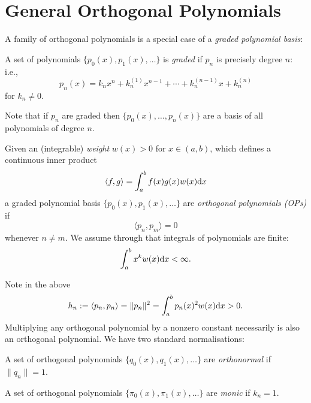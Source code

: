 
\section{General Orthogonal Polynomials}
A family of orthogonal polynomials is a special case of a \emph{graded polynomial basis}:

\begin{definition} A set of polynomials $\{p_0(x), p_1(x), \ensuremath{\ldots} \}$ is \emph{graded} if $p_n$ is precisely degree $n$: i.e.,
\[
p_n(x) = k_n x^n + k_n^{(1)} x^{n-1} + \ensuremath{\cdots} + k_n^{(n-1)} x + k_n^{(n)}
\]
for $k_n \ensuremath{\neq} 0$. \end{definition}

Note that if $p_n$ are graded then $\{p_0(x), \ensuremath{\ldots}, p_n(x) \}$ are a basis of all polynomials of degree $n$.

\begin{definition} Given an (integrable) \emph{weight} $w(x) > 0$ for $x \ensuremath{\in} (a,b)$, which defines a continuous inner product
\[
\ensuremath{\langle}f,g\ensuremath{\rangle} = \ensuremath{\int}_a^b  f(x) g(x) w(x) {\rm d} x
\]
a graded polynomial basis $\{p_0(x), p_1(x), \ensuremath{\ldots} \}$ are \emph{orthogonal polynomials (OPs)} if
\[
\ensuremath{\langle}p_n,p_m\ensuremath{\rangle} = 0
\]
whenever $n \ensuremath{\neq} m$. We assume through that integrals of polynomials are finite:
\[
\ensuremath{\int}_a^b  x^k w(x) {\rm d} x < \ensuremath{\infty}.
\]
\end{definition}

Note in the above
\[
h_n := \ensuremath{\langle}p_n,p_n\ensuremath{\rangle} = \|p_n\|^2 = \ensuremath{\int}_a^b  p_n(x)^2 w(x) {\rm d} x > 0.
\]
Multiplying any orthogonal polynomial by a nonzero constant necessarily is also an orthogonal polynomial. We have two standard normalisations:

\begin{definition} A set of orthogonal polynomials $\{q_0(x), q_1(x), \ensuremath{\ldots} \}$ are \emph{orthonormal} if $\|q_n\| = 1$. \end{definition}

\begin{definition} A set of orthogonal polynomials $\{\ensuremath{\pi}_0(x), \ensuremath{\pi}_1(x), \ensuremath{\ldots} \}$ are \emph{monic} if $k_n = 1$. \end{definition}

